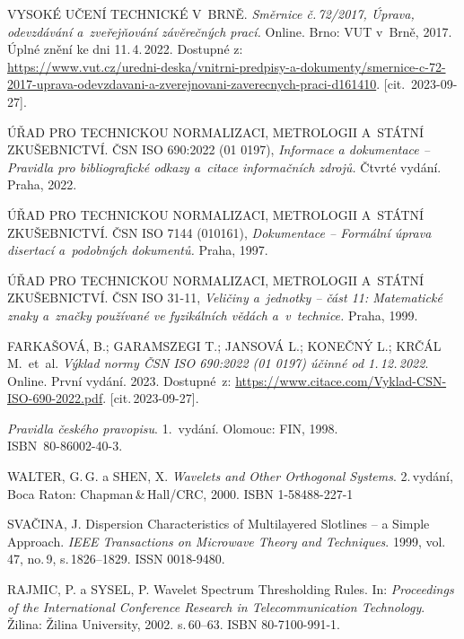 

\begin{thebibliography}{99}
	
	VYSOKÉ UČENÍ TECHNICKÉ V~BRNĚ.
	\emph{Směrnice č.\,72/2017, Úprava, odevzdávání a~zveřejňování závěrečných prací.}
	Online. Brno: VUT v~Brně, 2017.
	Úplné znění ke dni 11.\,4.\,2022.
	Dostupné z:\\
	{\small
	\url{https://www.vut.cz/uredni-deska/vnitrni-predpisy-a-dokumenty/smernice-c-72-2017-uprava-odevzdavani-a-zverejnovani-zaverecnych-praci-d161410}.}
	[cit.\ 2023-09-27].

    ÚŘAD PRO TECHNICKOU NORMALIZACI, METROLOGII A~STÁTNÍ ZKUŠEBNICTVÍ.
    ČSN ISO 690:2022 (01 0197), \emph{Informace a dokumentace -- Pravidla pro bibliografické odkazy a~citace informačních zdrojů.}
    Čtvrté vydání. Praha, 2022.

    ÚŘAD PRO TECHNICKOU NORMALIZACI, METROLOGII A~STÁTNÍ ZKUŠEBNICTVÍ.
    ČSN ISO 7144 (010161), \emph{Dokumentace -- Formální úprava disertací a~podobných dokumentů.}
    Praha, 1997.

    ÚŘAD PRO TECHNICKOU NORMALIZACI, METROLOGII A~STÁTNÍ ZKUŠEBNICTVÍ.
    ČSN ISO 31-11, \emph{Veličiny a~jednotky -- část 11: Matematické znaky a~značky používané ve fyzikálních vědách a~v~technice.}
    Praha, 1999.

	FARKAŠOVÁ, B.; GARAMSZEGI T.; JANSOVÁ L.; KONEČNÝ L.; KRČÁL M.\ et~al.
	\emph{Výklad normy ČSN ISO 690:2022 (01 0197) účinné od 1.\,12.\,2022}.
	 Online. První vydání. 2023.
	Dostupné~z:
	\url{https://www.citace.com/Vyklad-CSN-ISO-690-2022.pdf}.
	[cit.\,2023-09-27].

    \emph{Pravidla českého pravopisu}.
	1.\ vydání. Olomouc: FIN, 1998.\\
	\mbox{ISBN 80-86002-40-3}.

	WALTER, G.\,G. a SHEN, X.
	\emph{Wavelets and Other Orthogonal Systems}.
	2.\,vydání, Boca Raton: Chapman\,\&\,Hall/CRC, 2000.
	ISBN 1-58488-227-1

	SVAČINA, J.
	Dispersion Characteristics of Multilayered Slotlines -- a Simple Approach.
	\emph{IEEE Transactions on Microwave Theory and Techniques}.
	1999, vol.\,47, no.\,9, s.\,1826--1829. ISSN 0018-9480.

    RAJMIC, P. a SYSEL, P.
    Wavelet Spectrum Thresholding Rules.
    In: \emph{Proceedings of the International Conference Research in Telecommunication Technology}.
    Žilina: Žilina University, 2002. s.\,60--63. ISBN 80-7100-991-1.

\end{thebibliography}


